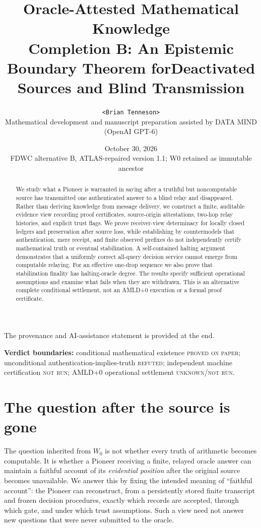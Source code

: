 \documentclass[11pt,letterpaper]{article}
\title{\bfseries Oracle-Attested Mathematical Knowledge\\[3pt]
\large Completion B: An Epistemic Boundary Theorem for\newline Deactivated Sources and Blind Transmission}
\author{\texttt{<Brian Tenneson>}\\\small Mathematical development and manuscript preparation assisted by DATA MIND (OpenAI GPT-6)}
\date{October 30, 2026\\\small FDWC alternative B, ATLAS-repaired version 1.1; W0 retained as immutable ancestor}
\begin{document}
\maketitle
\begin{center}\small The provenance and AI-assistance statement is provided at the end.\end{center}
\begin{abstract}
We study what a Pioneer is warranted in saying after a truthful but noncomputable source has transmitted one authenticated answer to a blind relay and disappeared. Rather than deriving knowledge from message delivery, we construct a finite, auditable evidence view recording proof certificates, source-origin attestations, two-hop relay histories, and explicit trust flags. We prove receiver-view determinacy for locally closed ledgers and preservation after source loss, while establishing by countermodels that authentication, mere receipt, and finite observed prefixes do not independently certify mathematical truth or eventual stabilization. A self-contained halting argument demonstrates that a uniformly correct all-query decision service cannot emerge from computable relaying. For an effective one-drop sequence we also prove that stabilization finality has halting-oracle degree. The results specify sufficient operational assumptions and examine what fails when they are withdrawn. This is an alternative complete conditional settlement, not an AMLD+0 execution or a formal proof certificate.
\end{abstract}
\noindent\textbf{Verdict boundaries:} conditional mathematical existence \textsc{proved on paper}; unconditional authentication-implies-truth \textsc{refuted}; independent machine certification \textsc{not run}; AMLD+0 operational settlement \textsc{unknown/not run}.
\tableofcontents

\section{The question after the source is gone}
The question inherited from $W_0$ is not whether every truth of arithmetic becomes computable. It is whether a Pioneer receiving a finite, relayed oracle answer can maintain a faithful account of its \emph{evidential position} after the original source becomes unavailable. We answer this by fixing the intended meaning of ``faithful account'': the Pioneer can reconstruct, from a persistently stored finite transcript and frozen decision procedures, exactly which records are accepted, through which gate, and under which trust assumptions. Such a view need not answer new questions that were never submitted to the oracle.
\end{document}
